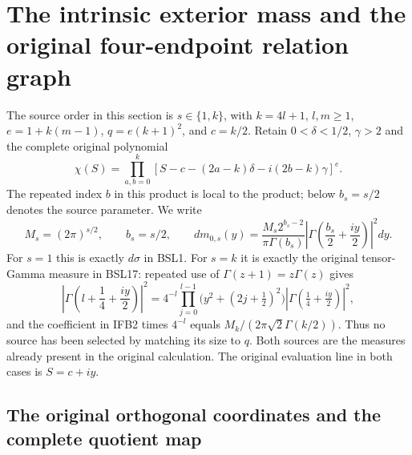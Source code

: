 \documentclass[11pt,a4paper]{article}
\begin{document}


\section{The intrinsic exterior mass and the original four-endpoint relation graph}
\label{sec:IFB}

The source order in this section is $s\in\{1,k\}$, with
$k=4l+1$, $l,m\geq1$, $e=1+k(m-1)$,
$q=e(k+1)^2$, and $c=k/2$.
Retain $0<\delta<1/2$, $\gamma>2$ and the complete original polynomial
\[
 \chi(S)=\prod_{a,b=0}^k
 [S-c-(2a-k)\delta-i(2b-k)\gamma]^e.
 \tag{IFB1}
\]
The repeated index $b$ in this product is local to the product; below
$b_s=s/2$ denotes the source parameter. We write
\[
 M_s=(2\pi)^{s/2},\qquad b_s=s/2,\qquad
 dm_{0,s}(y)=
 \frac{M_s2^{b_s-2}}{\pi\Gamma(b_s)}
 \left|\Gamma\left(\frac{b_s}{2}+\frac{iy}{2}\right)\right|^2dy.
 \tag{IFB2}
\]
For $s=1$ this is exactly $d\sigma$ in BSL1. For $s=k$ it is
exactly the original tensor-Gamma measure in BSL17: repeated use of
$\Gamma(z+1)=z\Gamma(z)$ gives
\[
 \left|\Gamma\left(l+\frac14+\frac{iy}{2}\right)\right|^2
 =4^{-l}\prod_{j=0}^{l-1}\bigl(y^2+(2j+\tfrac12)^2\bigr)
       |\Gamma(\tfrac14+\tfrac{iy}{2})|^2,
\]
and the coefficient in IFB2 times $4^{-l}$ equals
$M_k/(2\pi\sqrt2\Gamma(k/2))$. Thus no source has been selected
by matching its size to $q$. Both sources are the measures already
present in the original calculation. The original evaluation line in
both cases is $S=c+iy$.

\subsection{The original orthogonal coordinates and the complete quotient map}
\end{document}
